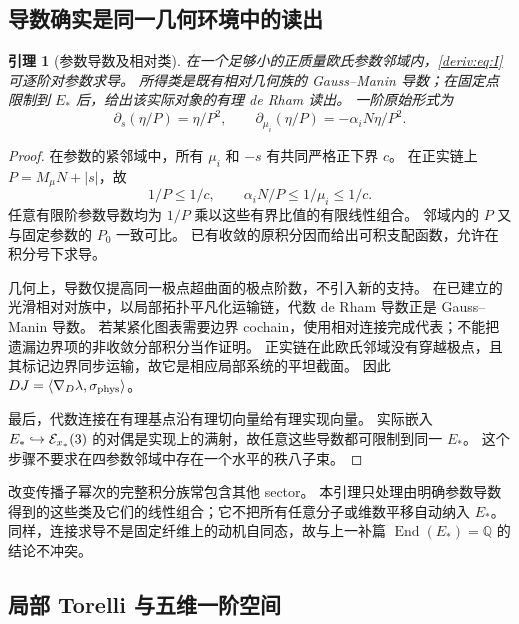 \documentclass[11pt,a4paper,oneside]{ctexart}
\theoremstyle{cnplain}
\newtheorem{lemma}[theorem]{引理}
\theoremstyle{definition}
\theoremstyle{remark}
\newcommand{\Q}{\mathbb Q}
\numberwithin{equation}{section}
\begin{document}
\subsection{导数确实是同一几何环境中的读出}
\begin{lemma}[参数导数及相对类]\label{deriv:lem:actual}
在一个足够小的正质量欧氏参数邻域内，\eqref{deriv:eq:I} 可逐阶对参数求导。
所得类是既有相对几何族的 Gauss--Manin 导数；在固定点限制到 $E_*$ 后，给出该实际对象的有理 de Rham 读出。
一阶原始形式为
\begin{equation}\label{deriv:eq:derforms}
 \partial_s(\eta/P)=\eta/P^2,\qquad
 \partial_{\mu_i}(\eta/P)=-\alpha_iN\eta/P^2.
\end{equation}
\end{lemma}
\begin{proof}
在参数的紧邻域中，所有 $\mu_i$ 和 $-s$ 有共同严格正下界 $c$。
在正实链上 $P=M_\mu N+|s|$，故
\[
 1/P\le 1/c,\qquad \alpha_iN/P\le1/\mu_i\le1/c.
\]
任意有限阶参数导数均为 $1/P$ 乘以这些有界比值的有限线性组合。
邻域内的 $P$ 又与固定参数的 $P_0$ 一致可比。
已有收敛的原积分因而给出可积支配函数，允许在积分号下求导。

几何上，导数仅提高同一极点超曲面的极点阶数，不引入新的支持。
在已建立的光滑相对对族中，以局部拓扑平凡化运输链，代数 de Rham 导数正是 Gauss--Manin 导数。
若某紧化图表需要边界 cochain，使用相对连接完成代表；不能把遗漏边界项的非收敛分部积分当作证明。
正实链在此欧氏邻域没有穿越极点，且其标记边界同步运输，故它是相应局部系统的平坦截面。
因此 $D J=\langle\nabla_D\lambda,\sigma_{\rm phys}\rangle$。

最后，代数连接在有理基点沿有理切向量给有理实现向量。
实际嵌入 $E_*\hookrightarrow\mathcal E_{x_*}(3)$ 的对偶是实现上的满射，故任意这些导数都可限制到同一 $E_*$。
这个步骤不要求在四参数邻域中存在一个水平的秩八子束。
\end{proof}

改变传播子幂次的完整积分族常包含其他 sector。
本引理只处理由明确参数导数得到的这些类及它们的线性组合；它不把所有任意分子或维数平移自动纳入 $E_*$。
同样，连接求导不是固定纤维上的动机自同态，故与上一补篇 $\operatorname{End}(E_*)=\Q$ 的结论不冲突。


\subsection{局部 Torelli 与五维一阶空间}
\end{document}
